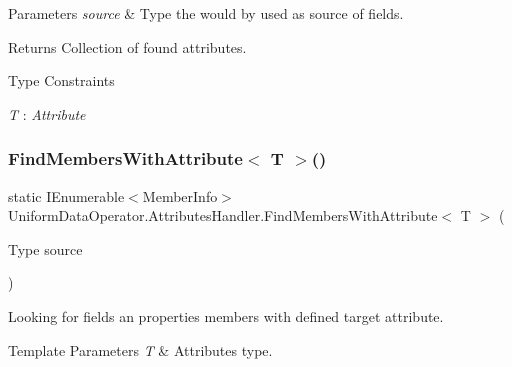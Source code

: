 \begin{DoxyParams}{Parameters}
{\em source} & Type the would by used as source of fields.\\
\hline
\end{DoxyParams}
\begin{DoxyReturn}{Returns}
Collection of found attributes.
\end{DoxyReturn}
\begin{Desc}
\item[Type Constraints]\begin{description}
\item[{\em T} : {\em Attribute}]\end{description}
\end{Desc}
\mbox{\label{class_uniform_data_operator_1_1_attributes_handler_af629ef53b40e2b73b2e8fb5dafd1239d}} 
\subsubsection{\texorpdfstring{Find\+Members\+With\+Attribute$<$ T $>$()}{FindMembersWithAttribute< T >()}\hspace{0.1cm}{\footnotesize\ttfamily [1/2]}}
{\footnotesize\ttfamily static I\+Enumerable$<$Member\+Info$>$ Uniform\+Data\+Operator.\+Attributes\+Handler.\+Find\+Members\+With\+Attribute$<$ T $>$ (\begin{DoxyParamCaption}\item[{Type}]{source }\end{DoxyParamCaption})\hspace{0.3cm}{\ttfamily [static]}}



Looking for fields an properties members with defined target attribute. 


\begin{DoxyTemplParams}{Template Parameters}
{\em T} & Attribute\textquotesingle{}s type.\\
\hline
\end{DoxyTemplParams}

